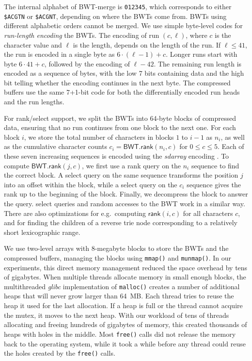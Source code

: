 \documentclass[smallabstract,smallcaptions]{dccpaper}
\newcommand{\BWT}{\textsf{BWT}}
\newcommand{\mBWT}{\ensuremath{\mathsf{BWT}}}
\newcommand{\rank}{\textsf{rank}}
\newcommand{\select}{\textsf{select}}
\newcommand{\mrank}{\ensuremath{\mathsf{rank}}}
\newcommand{\BWTmerge}{\textsf{BWT\nobreakdash-merge}}
\begin{document}
The internal alphabet of \BWTmerge{} is \texttt{012345}, which corresponds to either \texttt{\$ACGTN} or \texttt{\$ACGNT}, depending on where the \BWT{}s come from. \BWT{}s using different alphabetic orders cannot be merged. We use simple byte-level codes for \emph{run-length encoding} the \BWT{}s. The encoding of run $(c, \ell)$, where $c$ is the character value and $\ell$ is the length, depends on the length of the run. If $\ell \le 41$, the run is encoded in a single byte as $6 \cdot (\ell-1) + c$. Longer runs start with byte $6 \cdot 41 + c$, followed by the encoding of $\ell-42$. The remaining run length is encoded as a sequence of bytes, with the low 7 bits containing data and the high bit telling whether the encoding continues in the next byte. The compressed buffers use the same 7+1\nobreakdash-bit code for both the differentially encoded run heads and the run lengths.

For \rank/\select{} support, we split the \BWT{}s into 64\nobreakdash-byte blocks of compressed data, ensuring that no run continues from one block to the next one. For each block $i$, we store the total number of characters in blocks $1$ to $i-1$ as $n_{i}$, as well as the cumulative character counts $c_{i} = \mBWT.\mrank(n_{i},c)$ for $0 \le c \le 5$. Each of these seven increasing sequences is encoded using the \emph{sdarray} encoding \cite{Okanohara2007}. To compute $\mBWT.\mrank(j,c)$, we first use a \rank{} query on the $n_{i}$ sequence to find the correct block. A \select{} query on the same sequence transforms the position $j$ into an offset within the block, while a \select{} query on the $c_{i}$ sequence gives the rank up to the beginning of the block. Finally, we decompress the block to answer the query. \select{} queries and random accesses to the \BWT{} work in a similar way. There are also optimizations for e.g.~computing $\mrank(i,c)$ for all characters $c$, and for finding the children of a reverse trie node corresponding to a relatively short lexicographic range.

We use two-level arrays with 8\nobreakdash-megabyte blocks to store the \BWT{}s and the compressed buffers, managing the blocks using \texttt{mmap()} and \texttt{munmap()}. In our experiments, this direct memory management reduced the space overhead by tens of gigabytes. When multiple threads allocate memory in small enough blocks, the multithreaded \emph{glibc} implementation of \texttt{malloc()} creates a number of additional heaps that will never grow larger than 64~MB. Each thread tries to reuse the heap it used for the last allocation. If a heap is full or the thread cannot acquire the mutex, it moves to the next heap. With our workload of tens of threads allocating and freeing hundreds of gigabytes of memory, this created thousands of heaps with holes in the middle. Most \texttt{free()} calls did not release the memory back to the operating system, while it took a while before any thread could reuse the holes created by the \texttt{free()} calls.
\end{document}
